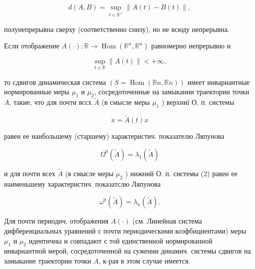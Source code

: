 \documentclass[10pt]{article}
\begin{document}
\[

d(A, B)=\sup _{t \in \mathbb{R}^{+}}\|A(t)-B(t)\|,

\]



полунепрерывна сверху (соответственно снизу), но не всюду непрерывна.



Если отображение $A(\cdot): \mathbb{R} \rightarrow \operatorname{Hom}\left(\mathbb{R}^{n}, \mathbb{R}^{n}\right)$ равномерно непрерывно и



\[

\sup _{t \in \mathbb{R}}\|A(t)\|<+\infty,

\]



то сдвигов динамическая система $(S=\operatorname{Hom}(\mathbb{R} n, \mathbb{R} n))$ имеет инвариантные нормированные меры $\mu_{1}$ и $\mu_{2}$, сосредоточенные на замыкании траектории точки $A$, такие, что для почти вссх $\tilde{A}$ (в смысле меры $\mu_{1}$ ) верхниї О. п. системы



\[

\dot{x}=\tilde{A}(t) x

\]



равен ее наибольшему (старшему) характеристич. показателю Ляпунова



\[

\Omega^{0}(\tilde{A})=\lambda_{1}(\tilde{A})

\]



и для почти всех $\tilde{A}$ (в смысле меры $\mu_{2}$ ) нижний О. п. системы (2) равен ее наименьшему характеристич. показатслю Ляпунова



\[

\omega^{0}(\tilde{A})=\lambda_{n}(\tilde{A}) .

\]



Для почти периодич. отображения $A(\cdot)$ (см. Линейная система дифберенциальных уравнений с почти периодическими коэфбициентами) меры $\mu_{1}$ и $\mu_{2}$ идентичны и совпадают с той единственной нормированной инвариантной мерой, сосредоточенной на сужении динамич. системы сдвигов на замыкание траектории точки $A$, к-рая в этом случае имеется.
\end{document}
